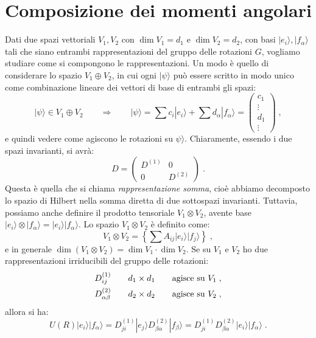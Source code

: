 \documentclass[10pt,a4paper]{report}
\theoremstyle{definition}
\numberwithin{equation}{section}
\newcommand{\ket}{\rangle}
\begin{document}
\section{Composizione dei momenti angolari}
Dati due spazi vettoriali $V_1,V_2$ con $\dim V_1=d_1$ e $\dim V_2=d_2$, con basi $|e_i\ket,|f_{\alpha}\ket$ tali che siano entrambi rappresentazioni del gruppo delle rotazioni $G$, vogliamo studiare come si compongono le rappresentazioni. Un modo è quello di considerare lo spazio $V_1\oplus V_2$, in cui ogni $|\psi\ket$ può essere scritto in modo unico come combinazione lineare dei vettori di base di entrambi gli spazi:
\begin{equation}
|\psi\ket\in V_1\oplus V_2 \qquad \Longrightarrow\qquad |\psi\ket=\sum c_i|e_i\ket+\sum d_{\alpha}|f_{\alpha}\ket=
\left(\begin{matrix}
c_1 \\
\vdots \\
d_1 \\
\vdots
\end{matrix}\right)\;,
\end{equation}
e quindi vedere come agiscono le rotazioni su $\psi\ket$. Chiaramente, essendo i due spazi invarianti, si avrà:
\begin{equation}
D=\left(\begin{matrix}
D^{(1)} & 0 \\
0 & D^{(2)}
\end{matrix}\right)\;.
\end{equation}
Questa è quella che si chiama \textit{rappresentazione somma}, cioè abbiamo decomposto lo spazio di Hilbert nella somma diretta di due sottospazi invarianti. Tuttavia, possiamo anche definire il prodotto tensoriale $V_1\otimes V_2$, avente base $|e_i\ket\otimes |f_{\alpha}\ket=|e_i\ket|f_{\alpha}\ket$. Lo spazio $V_1\otimes V_2$ è definito come:
\begin{equation}
V_1\otimes V_2=\left\{\sum A_{ij}|e_i\ket|f_j\ket\right\}\;,
\end{equation}
e in generale $\dim(V_1\otimes V_2)=\dim V_1\cdot\dim V_2$. Se su $V_1$ e $V_2$ ho due rappresentazioni irriducibili del gruppo delle rotazioni:
\begin{align}
D_{ij}^{(1)} \qquad d_1\times d_1\qquad \mbox{agisce su $V_1$}\;, \notag \\
D_{\alpha\beta}^{(2)} \qquad d_2\times d_2\qquad \mbox{agisce su $V_2$}\;,
\end{align}
allora si ha:
\begin{equation}
U(R)|e_i\ket|f_{\alpha}\ket=D_{ji}^{(1)}|e_j\ket D_{\beta\alpha}^{(2)}|f_{\beta}\ket=D_{ji}^{(1)}D_{\beta\alpha}^{(2)}|e_i\ket|f_{\alpha}\ket\;.
\end{equation}
\end{document}
